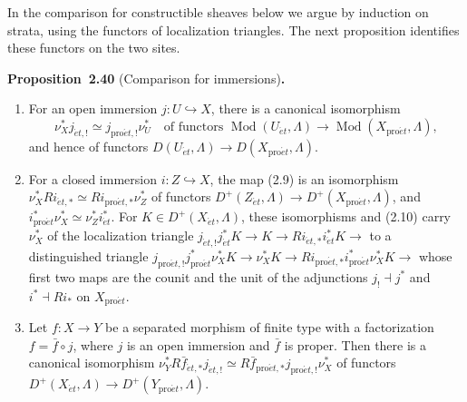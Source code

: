\documentclass[11pt]{article}
\newenvironment{bpstatement}[2]{\par\addvspace{0.6\baselineskip}\noindent\textbf{#1}#2\textbf{.}\enspace\ignorespaces}
  {\par\addvspace{0.4\baselineskip}}
\newenvironment{bpstatementit}[2]{\begin{bpstatement}{#1}{#2}\itshape\ignorespaces}{\end{bpstatement}}
\begin{document}
\label{bp118}%
In the comparison for constructible sheaves below we argue by induction on strata, using the functors of localization triangles. The next proposition identifies these functors on the two sites.

\label{bp119}%
\begin{bpstatementit}{Proposition~2.40}{ (Comparison for immersions)}
\begin{enumerate}
\item For an open immersion \(j:U\hookrightarrow X\), there is a canonical isomorphism \[
   \nu_X^*j_{\acute{e}t,!}\simeq j_{\mathrm{pro}\acute{e}t,!}\nu_U^*\quad\text{of functors }\operatorname{Mod}(U_{\acute{e}t},\Lambda)\to\operatorname{Mod}(X_{\mathrm{pro}\acute{e}t},\Lambda),
   \tag{2.10}
   \] and hence of functors \(D(U_{\acute{e}t},\Lambda)\to D(X_{\mathrm{pro}\acute{e}t},\Lambda)\).
\item For a closed immersion \(i:Z\hookrightarrow X\), the map (2.9) is an isomorphism \(\nu_X^*Ri_{\acute{e}t,*}\simeq Ri_{\mathrm{pro}\acute{e}t,*}\nu_Z^*\) of functors \(D^+(Z_{\acute{e}t},\Lambda)\to D^+(X_{\mathrm{pro}\acute{e}t},\Lambda)\), and \(i_{\mathrm{pro}\acute{e}t}^*\nu_X^*\simeq\nu_Z^*i_{\acute{e}t}^*\). For \(K\in D^+(X_{\acute{e}t},\Lambda)\), these isomorphisms and (2.10) carry \(\nu_X^*\) of the localization triangle \(j_{\acute{e}t,!}j_{\acute{e}t}^*K\to K\to Ri_{\acute{e}t,*}i_{\acute{e}t}^*K\to\) to a distinguished triangle \(j_{\mathrm{pro}\acute{e}t,!}j_{\mathrm{pro}\acute{e}t}^*\nu_X^*K\to\nu_X^*K\to Ri_{\mathrm{pro}\acute{e}t,*}i_{\mathrm{pro}\acute{e}t}^*\nu_X^*K\to\) whose first two maps are the counit and the unit of the adjunctions \(j_!\dashv j^*\) and \(i^*\dashv Ri_*\) on \(X_{\mathrm{pro}\acute{e}t}\).
\item Let \(f:X\to Y\) be a separated morphism of finite type with a factorization \(f=\bar f\circ j\), where \(j\) is an open immersion and \(\bar f\) is proper. Then there is a canonical isomorphism \(\nu_Y^*R\bar f_{\acute{e}t,*}j_{\acute{e}t,!}\simeq R\bar f_{\mathrm{pro}\acute{e}t,*}j_{\mathrm{pro}\acute{e}t,!}\nu_X^*\) of functors \(D^+(X_{\acute{e}t},\Lambda)\to D^+(Y_{\mathrm{pro}\acute{e}t},\Lambda)\).
\end{enumerate}
\end{bpstatementit}
\end{document}
